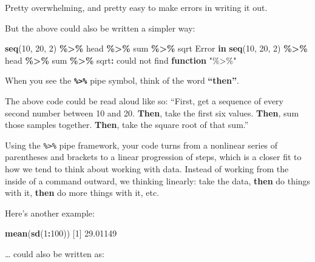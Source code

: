 \documentclass[
]{book}
\newenvironment{Shaded}{\begin{snugshade}}{\end{snugshade}}
\newcommand{\ControlFlowTok}[1]{\textcolor[rgb]{0.13,0.29,0.53}{\textbf{#1}}}
\newcommand{\DecValTok}[1]{\textcolor[rgb]{0.00,0.00,0.81}{#1}}
\newcommand{\FloatTok}[1]{\textcolor[rgb]{0.00,0.00,0.81}{#1}}
\newcommand{\FunctionTok}[1]{\textcolor[rgb]{0.13,0.29,0.53}{\textbf{#1}}}
\newcommand{\NormalTok}[1]{#1}
\newcommand{\SpecialCharTok}[1]{\textcolor[rgb]{0.81,0.36,0.00}{\textbf{#1}}}
\newcommand{\StringTok}[1]{\textcolor[rgb]{0.31,0.60,0.02}{#1}}
\begin{document}
Pretty overwhelming, and pretty easy to make errors in writing it out.

But the above could also be written a simpler way:

\begin{Shaded}
\begin{Highlighting}[]
\FunctionTok{seq}\NormalTok{(}\DecValTok{10}\NormalTok{, }\DecValTok{20}\NormalTok{, }\DecValTok{2}\NormalTok{) }\SpecialCharTok{\%\textgreater{}\%}\NormalTok{ head }\SpecialCharTok{\%\textgreater{}\%}\NormalTok{ sum }\SpecialCharTok{\%\textgreater{}\%}\NormalTok{ sqrt}
\NormalTok{Error }\ControlFlowTok{in} \FunctionTok{seq}\NormalTok{(}\DecValTok{10}\NormalTok{, }\DecValTok{20}\NormalTok{, }\DecValTok{2}\NormalTok{) }\SpecialCharTok{\%\textgreater{}\%}\NormalTok{ head }\SpecialCharTok{\%\textgreater{}\%}\NormalTok{ sum }\SpecialCharTok{\%\textgreater{}\%}\NormalTok{ sqrt}\SpecialCharTok{:}\NormalTok{ could not find }\ControlFlowTok{function} \StringTok{"\%\textgreater{}\%"}
\end{Highlighting}
\end{Shaded}

When you see the \textbf{\texttt{\%\textgreater{}\%}} pipe symbol, think of the word \textbf{``then''}.

The above code could be read aloud like so: ``First, get a sequence of every second number between 10 and 20. \textbf{Then}, take the first six values. \textbf{Then}, sum those samples together. \textbf{Then}, take the square root of that sum.''

Using the \texttt{\%\textgreater{}\%} pipe framework, your code turns from a nonlinear series of parentheses and brackets to a linear progression of steps, which is a closer fit to how we tend to think about working with data. Instead of working from the inside of a command outward, we thinking linearly: take the data, \textbf{then} do things with it, \textbf{then} do more things with it, etc.

Here's another example:

\begin{Shaded}
\begin{Highlighting}[]
\FunctionTok{mean}\NormalTok{(}\FunctionTok{sd}\NormalTok{(}\DecValTok{1}\SpecialCharTok{:}\DecValTok{100}\NormalTok{))}
\NormalTok{[}\DecValTok{1}\NormalTok{] }\FloatTok{29.01149}
\end{Highlighting}
\end{Shaded}

\ldots{} could also be written as:
\end{document}
